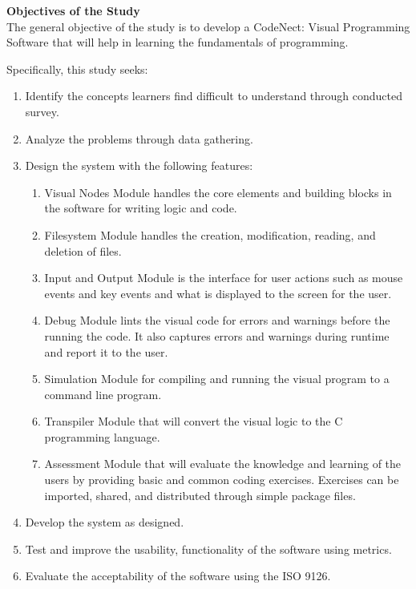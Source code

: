 \flushleft
\textbf{Objectives of the Study}\\
\justifying
\parx
The general objective of the study is to develop a CodeNect: Visual Programming
Software that will help in learning the fundamentals of programming.

\parx
Specifically, this study seeks:

\begin{enumerate}
	\item Identify the concepts learners find difficult to understand through conducted survey.
	\item Analyze the problems through data gathering.
	\item Design the system with the following features:
		\begin{enumerate}
			\item Visual Nodes Module handles the core elements and building blocks
				in the software for writing logic and code.
			\item Filesystem Module handles the creation, modification, reading, and
				deletion of files.
			\item Input and Output Module is the interface for user actions such as mouse
				events and key events and what is displayed to the screen for the user.
			\item Debug Module lints the visual code for errors and warnings before
				the running the code. It also captures errors and warnings during runtime
				and report it to the user.
			\item Simulation Module for compiling and running the visual program to
				a command line program.
			\item Transpiler Module that will convert the visual logic to the
				C programming language.
			\item Assessment Module that will evaluate the knowledge and learning of the
				users by providing basic and common coding exercises. Exercises can be
				imported, shared, and distributed through simple package files.
		\end{enumerate}

	\item Develop the system as designed.
	\item Test and improve the usability, functionality of the software using metrics.
	\item Evaluate the acceptability of the software using the ISO 9126. \\
\end{enumerate}
